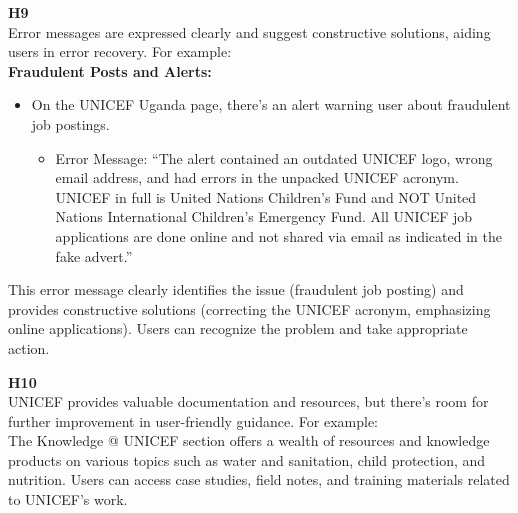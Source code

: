 \begin{description}
    \item {\textbf{H9} \color{unicefGray}{Help users recognize, diagnose, and recover from errors}}\\
    Error messages are expressed clearly and suggest constructive solutions, aiding users in error recovery. For example:\\
    \textbf{Fraudulent Posts and Alerts:}
    \begin{itemize}
        \item On the UNICEF Uganda page, there’s an alert warning user about fraudulent job postings.
        \begin{itemize}
            \item Error Message: “The alert contained an outdated UNICEF logo, wrong email address, and had errors in the unpacked UNICEF acronym. UNICEF in full is United Nations Children’s Fund and NOT United Nations International Children’s Emergency Fund. All UNICEF job applications are done online and not shared via email as indicated in the fake advert.”
        \end{itemize}
    \end{itemize}
    This error message clearly identifies the issue (fraudulent job posting) and provides constructive solutions (correcting the UNICEF acronym, emphasizing online applications). Users can recognize the problem and take appropriate action.
\end{description}
\begin{description}
    \item {\textbf{H10} \color{unicefGray}{Help and documentation}}\\
    UNICEF provides valuable documentation and resources, but there’s room for further improvement in user-friendly guidance. For example:\\
    The Knowledge @ UNICEF section offers a wealth of resources and knowledge products on various topics such as water and sanitation, child protection, and nutrition. Users can access case studies, field notes, and training materials related to UNICEF’s work.
\end{description}
